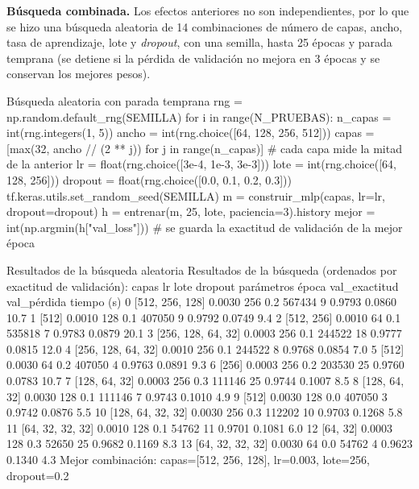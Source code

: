 \documentclass[11pt,letterpaper]{article}
\begin{document}
\textbf{Búsqueda combinada.} Los efectos anteriores no son independientes, por lo que se hizo una búsqueda aleatoria de 14 combinaciones de número de capas, ancho, tasa de aprendizaje, lote y \textit{dropout}, con una semilla, hasta 25 épocas y parada temprana (se detiene si la pérdida de validación no mejora en 3 épocas y se conservan los mejores pesos).

\begin{codigo}[label=cod:busqueda]{Búsqueda aleatoria con parada temprana}
rng = np.random.default_rng(SEMILLA)
for i in range(N_PRUEBAS):
    n_capas = int(rng.integers(1, 5))
    ancho = int(rng.choice([64, 128, 256, 512]))
    capas = [max(32, ancho // (2 ** j)) for j in range(n_capas)]   # cada capa mide la mitad de la anterior
    lr = float(rng.choice([3e-4, 1e-3, 3e-3]))
    lote = int(rng.choice([64, 128, 256]))
    dropout = float(rng.choice([0.0, 0.1, 0.2, 0.3]))
    tf.keras.utils.set_random_seed(SEMILLA)
    m = construir_mlp(capas, lr=lr, dropout=dropout)
    h = entrenar(m, 25, lote, paciencia=3).history
    mejor = int(np.argmin(h["val_loss"]))
    # se guarda la exactitud de validación de la mejor época
\end{codigo}

\begin{consola}[label=out:busqueda]{Resultados de la búsqueda aleatoria}
Resultados de la búsqueda (ordenados por exactitud de validación):
                 capas      lr  lote  dropout  parámetros  época  val_exactitud  val_pérdida  tiempo (s)
0      [512, 256, 128]  0.0030   256      0.2      567434      9         0.9793       0.0860        10.7
1                [512]  0.0010   128      0.1      407050      9         0.9792       0.0749         9.4
2           [512, 256]  0.0010    64      0.1      535818      7         0.9783       0.0879        20.1
3   [256, 128, 64, 32]  0.0003   256      0.1      244522     18         0.9777       0.0815        12.0
4   [256, 128, 64, 32]  0.0010   256      0.1      244522      8         0.9768       0.0854         7.0
5                [512]  0.0030    64      0.2      407050      4         0.9763       0.0891         9.3
6                [256]  0.0003   256      0.2      203530     25         0.9760       0.0783        10.7
7        [128, 64, 32]  0.0003   256      0.3      111146     25         0.9744       0.1007         8.5
8        [128, 64, 32]  0.0030   128      0.1      111146      7         0.9743       0.1010         4.9
9                [512]  0.0030   128      0.0      407050      3         0.9742       0.0876         5.5
10   [128, 64, 32, 32]  0.0030   256      0.3      112202     10         0.9703       0.1268         5.8
11    [64, 32, 32, 32]  0.0010   128      0.1       54762     11         0.9701       0.1081         6.0
12            [64, 32]  0.0003   128      0.3       52650     25         0.9682       0.1169         8.3
13    [64, 32, 32, 32]  0.0030    64      0.0       54762      4         0.9623       0.1340         4.3
Mejor combinación: capas=[512, 256, 128], lr=0.003, lote=256, dropout=0.2
\end{consola}
\end{document}
